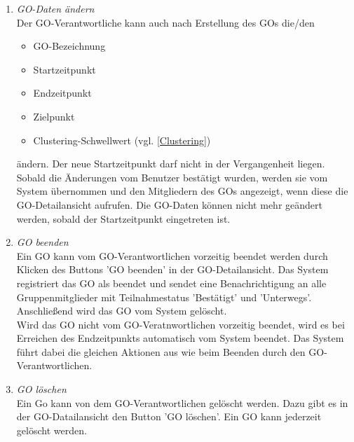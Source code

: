 \documentclass[parskip=full]{scrartcl}
\def\threedigits#1{%
  \ifnum#1<100 0\fi
  \ifnum#1<10 0\fi
  \number#1}
\begin{document}
\begin{enumerate}[label={\textbf{/F\protect\threedigits{\theenumi}0/}}, leftmargin=*, resume]	
	\item \textit{GO-Daten ändern}\label{GO Daten ändern} \\
	Der GO-Verantwortliche kann auch nach Erstellung des GOs die/den
	\begin{itemize}
		\item GO-Bezeichnung
		\item Startzeitpunkt
		\item Endzeitpunkt
		\item Zielpunkt
		\item \colorbox{shadecolor}{Clustering-Schwellwert (vgl. \ref{Clustering})}
	\end{itemize}
	ändern. Der neue Startzeitpunkt darf nicht in der Vergangenheit liegen. Sobald die Änderungen vom Benutzer bestätigt wurden, werden sie vom System übernommen und den Mitgliedern des GOs angezeigt, wenn diese die GO-Detailansicht aufrufen. Die GO-Daten können nicht mehr geändert werden, sobald der Startzeitpunkt eingetreten ist.
	
	\item \textit{GO beenden}\label{GO beenden} \\
	Ein GO kann vom GO-Verantwortlichen vorzeitig beendet werden durch Klicken des Buttons 'GO beenden' in der GO-Detailansicht. Das System registriert das GO als beendet und sendet eine Benachrichtigung an alle Gruppenmitglieder mit Teilnahmestatus 'Bestätigt' und 'Unterwegs'. Anschließend wird das GO vom System gelöscht. \\
	Wird das GO nicht vom GO-Veratnwortlichen vorzeitig beendet, wird es bei Erreichen des Endzeitpunkts automatisch vom System beendet. Das System führt dabei die gleichen Aktionen aus wie beim Beenden durch den GO-Verantwortlichen.
	
	\item \textit{GO löschen}\label{GO löschen} \\
	Ein Go kann von dem GO-Verantwortlichen gelöscht werden. Dazu gibt es in der GO-Datailansicht den Button 'GO löschen'. Ein GO kann jederzeit gelöscht werden.
\end{enumerate}
\end{document}

